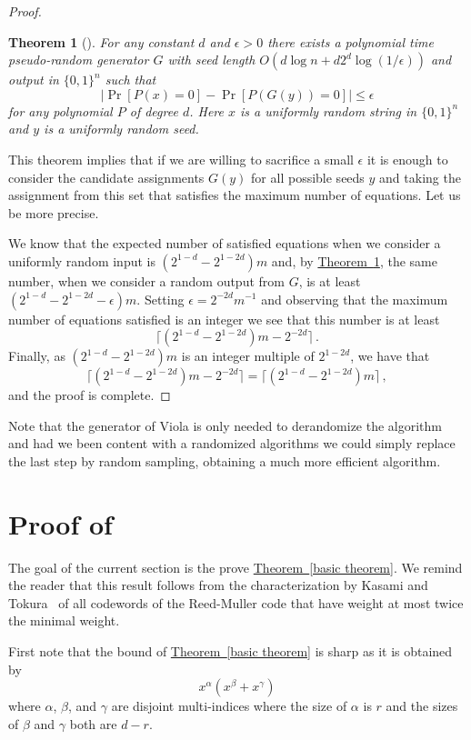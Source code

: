 \documentclass[10pt]{article}
\newtheorem{theorem}{Theorem}[section]
\theoremstyle{definition}
\numberwithin{equation}{section}
\newcommand{\expref}[2]{\texorpdfstring{\hyperref[#2]{#1~\ref{#2}}}{#1~\ref{#2}}}
\begin{document}
\begin{proof}
\begin{theorem}[\cite{viola09}]\label{thm:viola}
For any constant $d$ and $\epsilon > 0$ there exists
a polynomial time pseudo-random generator $G$ with
seed length $O(d \log n + d 2^d \log (1/\epsilon))$
and output in $\{ 0,1\}^n$ such that
$$
|\Pr[P(x)=0]- \Pr[P(G(y))=0]| \leq \epsilon
$$
for any polynomial $P$ of degree $d$.  Here $x$ is 
a uniformly random string in $\{ 0,1\}^n$ and
$y$ is a uniformly random seed.
\end{theorem}

This theorem implies that if we are willing
to sacrifice a small $\epsilon$ it is enough
to consider the candidate assignments 
$G(y)$ for all possible seeds $y$ and taking the assignment
from this set that satisfies the %
maximum
number of equations.  Let us be more precise.

We know that the expected number of satisfied
equations when we consider a uniformly random
input is $(2^{1-d}- 2^{1-2d}) m$ and, by
\expref{Theorem}{thm:viola}, the same number, when
we consider a random output from $G$, is
at least $(2^{1-d}- 2^{1-2d}-\epsilon) m$.
Setting $\epsilon= 2^{-2d} m^{-1}$ and observing that
the maximum number of equations satisfied is
an integer we see that this number is at least
$$
\lceil (2^{1-d}- 2^{1-2d}) m-2^{-2d} \rceil \,.
$$
Finally, as $(2^{1-d}- 2^{1-2d}) m$ is an integer
multiple of $2^{1-2d}$, we have that
$$
\lceil (2^{1-d}- 2^{1-2d}) m-2^{-2d} \rceil 
=\lceil (2^{1-d}- 2^{1-2d}) m \rceil\,,
$$
and the proof is complete.
\end{proof}

Note that the generator of Viola is only needed to
derandomize the algorithm and had we been content
with a randomized algorithms we could simply replace
the last step by random sampling, obtaining a much
more efficient algorithm.

\appendix
\section{Proof of \protect{\expref{Theorem}{basic theorem}}}

The goal of the current section is the prove 
\expref{Theorem}{basic theorem}.
We remind the reader that this result
follows from the characterization by
Kasami and Tokura~\cite{kt70} of 
all codewords of the Reed-Muller code
that have weight at most twice the
minimal weight.

First note that the bound of \expref{Theorem}{basic theorem} is
sharp as it is obtained by
$$x^\alpha (x^\beta+x^\gamma)$$ where $\alpha$,
$\beta$, and $\gamma$ are disjoint multi-indices
where the size of $\alpha$ is $r$ and the sizes
of $\beta$ and $\gamma$ both are $d-r$.
\end{document}
